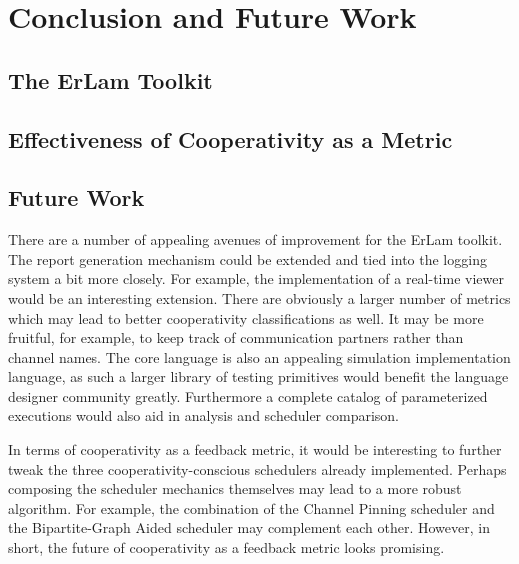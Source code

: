 \chapter{Conclusion and Future Work}
%
\label{chap:conclusions}

\section{The ErLam Toolkit}\label{sec:conclusions-erlam}


\section{Effectiveness of Cooperativity as a Metric}
\label{sec:conclusions-cooperativity}



\section{Future Work}\label{sec:future-work}

There are a number of appealing avenues of improvement for the ErLam toolkit. The
report generation mechanism could be extended and tied into the logging system a 
bit more  closely. For example, the implementation of a real-time viewer would be an 
interesting extension. There are obviously a larger number of metrics which may lead
to better cooperativity classifications as well. It may be more fruitful, for 
example, to keep track of communication partners rather than channel names. 
The core language is also an appealing simulation implementation language, as such a 
larger library of testing primitives would benefit the language designer community 
greatly. Furthermore a complete catalog of parameterized executions would also aid 
in analysis and scheduler comparison.

In terms of cooperativity as a feedback metric, it would be interesting to further
tweak the three cooperativity-conscious schedulers already implemented. Perhaps 
composing the scheduler mechanics themselves may lead to a more robust algorithm.
For example, the combination of the Channel Pinning scheduler and the 
Bipartite-Graph Aided scheduler may complement each other. However, in short, 
the future of cooperativity as a feedback metric looks promising.

